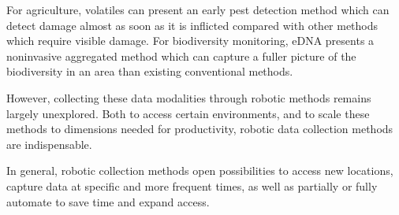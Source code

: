 For agriculture, volatiles can present an early pest detection method which can detect damage almost as soon as it is inflicted compared with other methods which require visible damage. For biodiversity monitoring, eDNA presents a noninvasive aggregated method which can capture a fuller picture of the biodiversity in an area than existing conventional methods.

However, collecting these data modalities through robotic methods remains largely unexplored. Both to access certain environments, and to scale these methods to dimensions needed for productivity, robotic data collection methods are indispensable. 



In general, robotic collection methods open possibilities to access new locations, capture data at specific and more frequent times, as well as partially or fully automate to save time and expand access.



